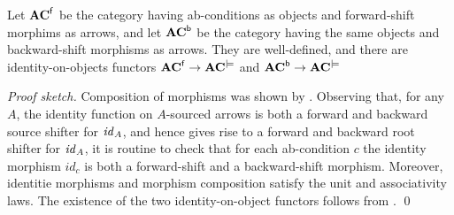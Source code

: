\begin{theorem} 
Let $\mathbf{AC}^{{\mathsf{f}}}$ be the category having ab-conditions as objects and forward-shift morphims as arrows, and let $\mathbf{AC}^{{\mathsf{b}}}$ be the category having the same objects and backward-shift morphisms as arrows. They are well-defined, and there are identity-on-objects functors $\mathbf{AC}^{{\mathsf{f}}} \to \mathbf{AC}^{\models}$ and $\mathbf{AC}^{{\mathsf{b}}} \to \mathbf{AC}^{\models}$
\end{theorem}
%
\emph{Proof sketch.} Composition of morphisms was shown by .
Observing that, for any $A$, the identity function on $A$-sourced arrows is both a forward and backward source shifter for $\mathit{id}_A$, and hence gives rise to a forward and backward root shifter for $\mathit{id}_A$, it is routine to check that for each ab-condition $c$ the identity morphism $id_c$ is both a forward-shift and a backward-shift morphism. Moreover, identitie morphisms and morphism composition satisfy the unit and associativity laws. The existence of the two identity-on-object functors follows from .
\qed 

